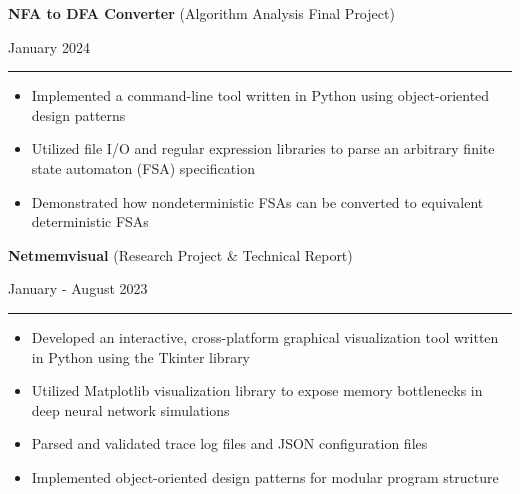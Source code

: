 \documentclass[letter]{article}
\begin{document}
    \noindent
    \begin{minipage}[c]{0.7\linewidth}
        \noindent \textbf{NFA to DFA Converter} (Algorithm Analysis Final Project)
    \end{minipage}
    \begin{minipage}[c]{0.291\linewidth}
        \begin{flushright}
            January 2024
        \end{flushright}
    \end{minipage}
    \vspace{4pt}
    \hrule
    \vspace{4pt}
    \noindent
    \begin{itemize}[noitemsep, topsep=0pt]
        \item Implemented a command-line tool written in Python using object-oriented design patterns
        \item Utilized file I/O and regular expression libraries to parse an arbitrary finite state automaton (FSA) specification
        \item Demonstrated how nondeterministic FSAs can be converted to equivalent deterministic FSAs
    \end{itemize}
    \medskip

    \noindent
    \begin{minipage}[c]{0.7\linewidth}
        \noindent \textbf{Netmemvisual} (Research Project \& Technical Report)
    \end{minipage}
    \begin{minipage}[c]{0.291\linewidth}
        \begin{flushright}
            January - August 2023
        \end{flushright}
    \end{minipage}
    \vspace{4pt}
    \hrule
    \vspace{4pt}
    \noindent
    \begin{itemize}[noitemsep, topsep=0pt]
        \item Developed an interactive, cross-platform graphical visualization tool written in Python using the Tkinter library
        \item Utilized Matplotlib visualization library to expose memory bottlenecks in deep neural network simulations
        \item Parsed and validated trace log files and JSON configuration files
        \item Implemented object-oriented design patterns for modular program structure
    \end{itemize}
    \medskip
\end{document}
